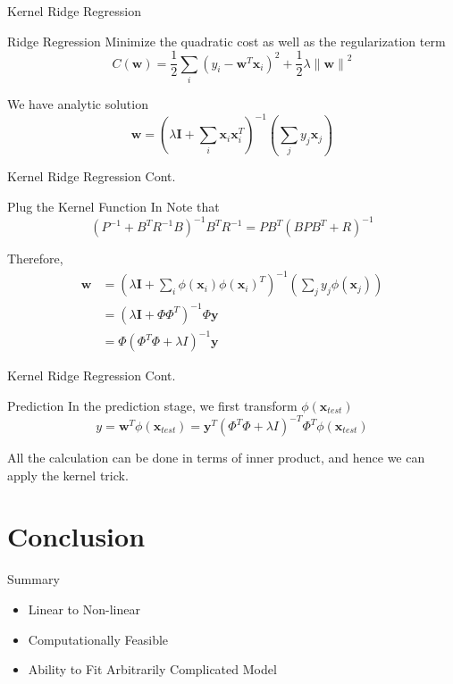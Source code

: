 \documentclass[10pt, compress]{beamer}
\begin{document}
\begin{frame}[fragile]{Kernel Ridge Regression}
  \begin{block}{Ridge Regression}
    Minimize the quadratic cost as well as the regularization term
    \[
      C(\mathbf{w}) = \frac{1}{2} \sum_{i} {(y_i - \mathbf{w}^T\mathbf{x}_i)}^2 + \frac{1}{2} \lambda {\| \mathbf{w} \|}^2
    \]

    We have analytic solution
    \[
      \mathbf{w} = {(\lambda \mathbf{I} + \sum_{i} \mathbf{x}_i \mathbf{x}_i^T )}^{-1} (\sum_{j} y_j \mathbf{x}_j)
    \]
  \end{block}
\end{frame}

\begin{frame}[fragile]{Kernel Ridge Regression Cont.}
  \begin{block}{Plug the Kernel Function In}
    Note that
    \[
      {(P^{-1} + B^T R^{-1} B)}^{-1} B^T R^{-1} = PB^T {(BPB^T + R)}^{-1}
    \]

    Therefore,
    \begin{align*}
      \mathbf{w} &= {(\lambda \mathbf{I} + \sum_{i} \phi(\mathbf{x}_i) {\phi(\mathbf{x}_i)}^T )}^{-1} (\sum_{j} y_j \phi(\mathbf{x}_j)) \\
                &= {(\lambda \mathbf{I} + \Phi \Phi^T) }^{-1} \Phi \mathbf{y} \\
                &= \Phi {(\Phi^T \Phi + \lambda I)}^{-1} \mathbf{y}
    \end{align*}
  \end{block}
\end{frame}

\begin{frame}[fragile]{Kernel Ridge Regression Cont.}
  \begin{block}{Prediction}
    In the prediction stage, we first transform \( \phi(\mathbf{x}_{test}) \)
    \[
      y = \mathbf{w}^T \phi(\mathbf{x}_{test}) = \mathbf{y}^T {(\Phi^T \Phi + \lambda I)}^{-T} {\Phi}^T \phi(\mathbf{x}_{test})
    \]

    All the calculation can be done in terms of inner product, and hence we can apply the kernel trick.
  \end{block}
\end{frame}

\section{Conclusion}

\begin{frame}{Summary}

  \begin{itemize}
    \item Linear to Non-linear
    \item Computationally Feasible
    \item Ability to Fit Arbitrarily Complicated Model
  \end{itemize}

\end{frame}

\end{document}
